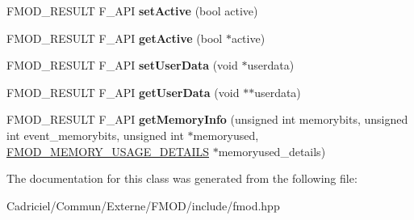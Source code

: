 \begin{DoxyCompactItemize}
\item 
\hypertarget{class_f_m_o_d_1_1_reverb_ace7f7f68d6f6298a356b9ee831f50aae}{F\-M\-O\-D\-\_\-\-R\-E\-S\-U\-L\-T F\-\_\-\-A\-P\-I {\bfseries set\-Active} (bool active)}\label{class_f_m_o_d_1_1_reverb_ace7f7f68d6f6298a356b9ee831f50aae}

\item 
\hypertarget{class_f_m_o_d_1_1_reverb_a50f3bbcec09517e400fa606330738e2b}{F\-M\-O\-D\-\_\-\-R\-E\-S\-U\-L\-T F\-\_\-\-A\-P\-I {\bfseries get\-Active} (bool $\ast$active)}\label{class_f_m_o_d_1_1_reverb_a50f3bbcec09517e400fa606330738e2b}

\item 
\hypertarget{class_f_m_o_d_1_1_reverb_ad29004efcf52bf367bc13fde07527647}{F\-M\-O\-D\-\_\-\-R\-E\-S\-U\-L\-T F\-\_\-\-A\-P\-I {\bfseries set\-User\-Data} (void $\ast$userdata)}\label{class_f_m_o_d_1_1_reverb_ad29004efcf52bf367bc13fde07527647}

\item 
\hypertarget{class_f_m_o_d_1_1_reverb_ac12115e79aebe3f8150c971b75de38c7}{F\-M\-O\-D\-\_\-\-R\-E\-S\-U\-L\-T F\-\_\-\-A\-P\-I {\bfseries get\-User\-Data} (void $\ast$$\ast$userdata)}\label{class_f_m_o_d_1_1_reverb_ac12115e79aebe3f8150c971b75de38c7}

\item 
\hypertarget{class_f_m_o_d_1_1_reverb_a9be1262ba585537bdd32e569eb999d05}{F\-M\-O\-D\-\_\-\-R\-E\-S\-U\-L\-T F\-\_\-\-A\-P\-I {\bfseries get\-Memory\-Info} (unsigned int memorybits, unsigned int event\-\_\-memorybits, unsigned int $\ast$memoryused, \hyperlink{struct_f_m_o_d___m_e_m_o_r_y___u_s_a_g_e___d_e_t_a_i_l_s}{F\-M\-O\-D\-\_\-\-M\-E\-M\-O\-R\-Y\-\_\-\-U\-S\-A\-G\-E\-\_\-\-D\-E\-T\-A\-I\-L\-S} $\ast$memoryused\-\_\-details)}\label{class_f_m_o_d_1_1_reverb_a9be1262ba585537bdd32e569eb999d05}

\end{DoxyCompactItemize}


The documentation for this class was generated from the following file\-:\begin{DoxyCompactItemize}
\item 
Cadriciel/\-Commun/\-Externe/\-F\-M\-O\-D/include/fmod.\-hpp\end{DoxyCompactItemize}
